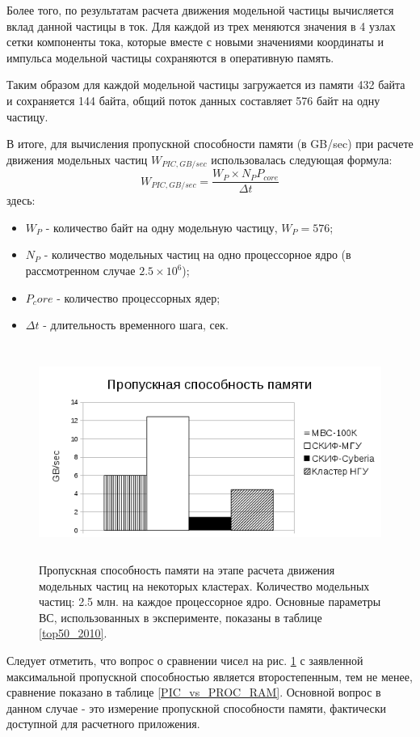 Более того, по результатам расчета движения модельной частицы вычисляется вклад данной частицы в ток. Для каждой из трех меняются значения в 4 узлах сетки компоненты тока, которые вместе с новыми значениями координаты и импульса модельной частицы сохраняются в оперативную память.

Таким образом для каждой модельной частицы загружается из памяти 432 байта и сохраняется 144 байта, общий поток данных составляет 576 байт на одну частицу.

В итоге, для вычисления пропускной способности памяти (в GB/sec) при расчете движения модельных частиц $W_{PIC,GB/sec}$ использовалась следующая формула:
\begin{equation}
W_{PIC,GB/sec} = \frac{W_P\times N_P P_{core}}{\Delta t}
\label{RAM_performance}
\end{equation}
здесь:
\begin{itemize}
	\item $W_P$ - количество байт на одну модельную частицу, $W_P = 576$;
	\item $N_P$ - количество модельных частиц на одно процессорное ядро (в рассмотренном случае $2.5\times 10^6$);  
	\item $P_core$ - количество процессорных ядер;
	\item $\Delta t$  - длительность временного шага, сек.
\end{itemize}	




\begin{figure}[htb]
	\begin{center}
		\includegraphics[height=7cm,keepaspectratio]{images/data_proc_throughput_GBsec.png}
	\end{center}
	\caption{Пропускная способность памяти на этапе расчета движения модельных частиц на некоторых кластерах. Количество модельных частиц: 2.5 млн. на каждое процессорное ядро. Основные параметры ВС, использованных в эксперименте, показаны в таблице \ref{top50_2010}.}
	\label{PIC_RAM}
\end{figure}
Следует отметить, что вопрос о сравнении чисел на рис. \ref{PIC_RAM} с заявленной максимальной пропускной способностью 
является второстепенным, тем не менее, сравнение показано в таблице \ref{PIC_vs_PROC_RAM}. Основной вопрос в данном случае - это измерение пропускной способности памяти,  фактически доступной для расчетного приложения.

